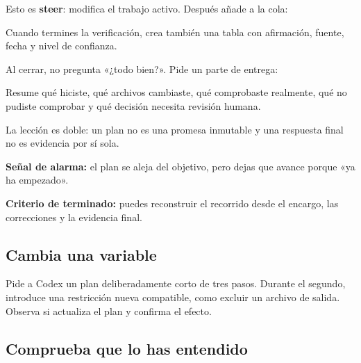 \documentclass[10pt,a4paper,openany]{book}
\newenvironment{Shaded}{}{}
\newcommand{\NormalTok}[1]{#1}
\renewenvironment{Shaded}
  {\begin{tcolorbox}[
    enhanced,
    breakable,
    colback=CodeBg,
    colframe=Border,
    boxrule=0.5pt,
    arc=2mm,
    left=3mm,
    right=3mm,
    top=2.2mm,
    bottom=2.2mm,
    before skip=0.8em,
    after skip=0.9em
  ]}
  {\end{tcolorbox}}
\begin{document}
Esto es \textbf{steer}: modifica el trabajo activo. Después añade a la
cola:

\begin{Shaded}
\begin{Highlighting}[]
\NormalTok{Cuando termines la verificación, crea también una tabla con afirmación,}
\NormalTok{fuente, fecha y nivel de confianza.}
\end{Highlighting}
\end{Shaded}

Al cerrar, no pregunta «¿todo bien?». Pide un parte de entrega:

\begin{Shaded}
\begin{Highlighting}[]
\NormalTok{Resume qué hiciste, qué archivos cambiaste, qué comprobaste realmente,}
\NormalTok{qué no pudiste comprobar y qué decisión necesita revisión humana.}
\end{Highlighting}
\end{Shaded}

La lección es doble: un plan no es una promesa inmutable y una respuesta
final no es evidencia por sí sola.

\begin{warningbox}

\textbf{Señal de alarma:} el plan se aleja del objetivo, pero dejas que
avance porque «ya ha empezado».

\end{warningbox}

\begin{successbox}

\textbf{Criterio de terminado:} puedes reconstruir el recorrido desde el
encargo, las correcciones y la evidencia final.

\end{successbox}

\subsection{Cambia una variable}\label{cambia-una-variable-5}

Pide a Codex un plan deliberadamente corto de tres pasos. Durante el
segundo, introduce una restricción nueva compatible, como excluir un
archivo de salida. Observa si actualiza el plan y confirma el efecto.

\subsection{Comprueba que lo has
entendido}\label{comprueba-que-lo-has-entendido-5}
\end{document}
